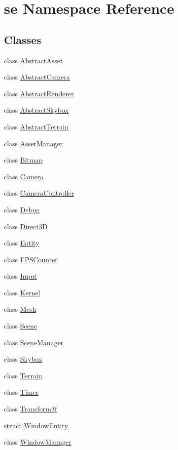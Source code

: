 \hypertarget{namespacese}{}\section{se Namespace Reference}
\label{namespacese}
\subsection*{Classes}
\begin{DoxyCompactItemize}
\item 
class \mbox{\hyperlink{classse_1_1_abstract_asset}{Abstract\+Asset}}
\item 
class \mbox{\hyperlink{classse_1_1_abstract_camera}{Abstract\+Camera}}
\item 
class \mbox{\hyperlink{classse_1_1_abstract_renderer}{Abstract\+Renderer}}
\item 
class \mbox{\hyperlink{classse_1_1_abstract_skybox}{Abstract\+Skybox}}
\item 
class \mbox{\hyperlink{classse_1_1_abstract_terrain}{Abstract\+Terrain}}
\item 
class \mbox{\hyperlink{classse_1_1_asset_manager}{Asset\+Manager}}
\item 
class \mbox{\hyperlink{classse_1_1_bitmap}{Bitmap}}
\item 
class \mbox{\hyperlink{classse_1_1_camera}{Camera}}
\item 
class \mbox{\hyperlink{classse_1_1_camera_controller}{Camera\+Controller}}
\item 
class \mbox{\hyperlink{classse_1_1_debug}{Debug}}
\item 
class \mbox{\hyperlink{classse_1_1_direct3_d}{Direct3D}}
\item 
class \mbox{\hyperlink{classse_1_1_entity}{Entity}}
\item 
class \mbox{\hyperlink{classse_1_1_f_p_s_counter}{F\+P\+S\+Counter}}
\item 
class \mbox{\hyperlink{classse_1_1_input}{Input}}
\item 
class \mbox{\hyperlink{classse_1_1_kernel}{Kernel}}
\item 
class \mbox{\hyperlink{classse_1_1_mesh}{Mesh}}
\item 
class \mbox{\hyperlink{classse_1_1_scene}{Scene}}
\item 
class \mbox{\hyperlink{classse_1_1_scene_manager}{Scene\+Manager}}
\item 
class \mbox{\hyperlink{classse_1_1_skybox}{Skybox}}
\item 
class \mbox{\hyperlink{classse_1_1_terrain}{Terrain}}
\item 
class \mbox{\hyperlink{classse_1_1_timer}{Timer}}
\item 
class \mbox{\hyperlink{classse_1_1_transform3f}{Transform3f}}
\item 
struct \mbox{\hyperlink{structse_1_1_window_entity}{Window\+Entity}}
\item 
class \mbox{\hyperlink{classse_1_1_window_manager}{Window\+Manager}}
\end{DoxyCompactItemize}
